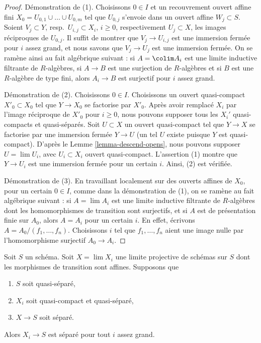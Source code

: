 \begin{proof}
Démonstration de (1). Choisissons $0 \in I$ et un recouvrement ouvert affine
fini $X_0 = U_{0, 1} \cup \ldots \cup U_{0, m}$ tel que $U_{0, j}$ s'envoie
dans un ouvert affine $W_j \subset S$. Soient $V_j \subset Y$,
resp.\ $U_{i, j} \subset X_i$, $i \geq 0$, respectivement
$U_j \subset X$, les images réciproques de $U_{0, j}$. Il suffit de montrer
que $V_j \to U_{i, j}$ est une immersion fermée pour $i$ assez grand, et
nous savons que $V_j \to U_j$ est une immersion fermée. On se ramène ainsi
au fait algébrique suivant : si $A = \colim A_i$ est une limite inductive
filtrante de $R$-algèbres, si $A \to B$ est une surjection de $R$-algèbres
et si $B$ est une $R$-algèbre de type fini, alors $A_i \to B$ est surjectif
pour $i$ assez grand.

\medskip\noindent
Démonstration de (2). Choisissons $0 \in I$. Choisissons un ouvert
quasi-compact $X'_0 \subset X_0$ tel que $Y \to X_0$ se factorise par $X'_0$.
Après avoir remplacé $X_i$ par l'image réciproque de
$X'_0$ pour $i \geq 0$, nous pouvons supposer tous les $X_i'$ quasi-compacts et
quasi-séparés. Soit $U \subset X$ un ouvert quasi-compact tel que
$Y \to X$ se factorise par une immersion fermée $Y \to U$ (un tel $U$
existe puisque $Y$ est quasi-compact). D'après le
Lemme \ref{lemma-descend-opens}, nous pouvons supposer
$U = \lim U_i$, avec $U_i \subset X_i$ ouvert quasi-compact. L'assertion (1)
montre que $Y \to U_i$ est une immersion fermée pour un certain $i$. Ainsi,
(2) est vérifiée.

\medskip\noindent
Démonstration de (3). En travaillant localement sur des ouverts affines de
$X_0$, pour un certain $0 \in I$, comme dans la démonstration de (1), on se
ramène au fait algébrique suivant : si $A = \lim A_i$ est une limite
inductive filtrante de $R$-algèbres dont les homomorphismes de transition
sont surjectifs, et si $A$ est de présentation finie sur $A_0$, alors
$A = A_i$ pour un certain $i$. En effet, écrivons
$A = A_0/(f_1, \ldots, f_n)$. Choisissons $i$ tel que
$f_1, \ldots, f_n$ aient une image nulle par l'homomorphisme surjectif
$A_0 \to A_i$.
\end{proof}

\begin{lemma}
\label{lemma-eventually-separated}
Soit $S$ un schéma. Soit $X = \lim X_i$ une limite projective de schémas sur
$S$ dont les morphismes de transition sont affines. Supposons que
\begin{enumerate}
\item $S$ soit quasi-séparé,
\item $X_i$ soit quasi-compact et quasi-séparé,
\item $X \to S$ soit séparé.
\end{enumerate}
Alors $X_i \to S$ est séparé pour tout $i$ assez grand.
\end{lemma}

